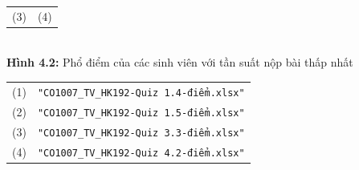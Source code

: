 \documentclass[a4paper]{article}
\theoremstyle{definition}
\begin{document}
\begin{enumerate}[a)]
\begin{itemize}
\begin{center}
\begin{tabular}{c c}
             (3) & (4)
        \end{tabular}\\
        \textbf{Hình 4.2:} Phổ điểm của các sinh viên với tần suất nộp bài thấp nhất\\
        \begin{tabular}{c c}
             (1) & \texttt{"CO1007\_TV\_HK192-Quiz 1.4-điểm.xlsx"}\\
             (2) & \texttt{"CO1007\_TV\_HK192-Quiz 1.5-điểm.xlsx"}\\
             (3) & \texttt{"CO1007\_TV\_HK192-Quiz 3.3-điểm.xlsx"}\\
             (4) & \texttt{"CO1007\_TV\_HK192-Quiz 4.2-điểm.xlsx"}
        \end{tabular}
    \end{center}
            

\end{itemize}
\end{enumerate}
\end{document}

